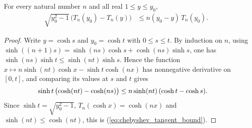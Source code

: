 \begin{theorem}
    \label{thm:chebyshev_tangent_bound}
    \leanok
    For every natural number $n$ and all real $1\le y\le y_0$,
    \begin{align}
        \sqrt{y_0^2-1}\,\bigl(T_n(y_0)-T_n(y)\bigr)
         & \le n(y_0-y)\,T_n(y_0).
        \label{eq:chebyshev_tangent_bound}
    \end{align}
\end{theorem}
\begin{proof}\leanok
    Write $y=\cosh s$ and $y_0=\cosh t$ with $0\le s\le t$. By induction on
    $n$, using $\sinh((n+1)s)=\sinh(ns)\cosh s+\cosh(ns)\sinh s$, one has
    $\sinh(ns)\sinh t\le\sinh(nt)\sinh s$. Hence the function
    $x\mapsto n\sinh(nt)\cosh x-\sinh t\cosh(nx)$ has nonnegative derivative
    on $[0,t]$, and comparing its values at $s$ and $t$ gives
    \begin{align}
        \sinh t\,\bigl(\cosh(nt)-\cosh(ns)\bigr)
         & \le n\sinh(nt)\,(\cosh t-\cosh s).\notag
    \end{align}
    Since $\sinh t=\sqrt{y_0^2-1}$, $T_n(\cosh x)=\cosh(nx)$ and
    $\sinh(nt)\le\cosh(nt)$, this is (\ref{eq:chebyshev_tangent_bound}).
\end{proof}


